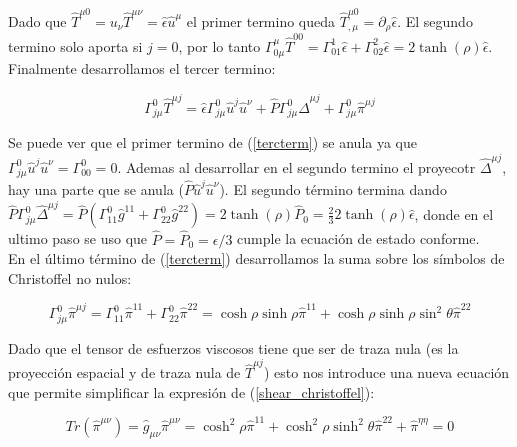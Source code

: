 \documentclass[11pt,a4paper]{article}
\begin{document}
Dado que $\hat{T}^{{\mu}{0}}=u_{\nu}\hat{T}^{{\mu}{\nu}}=\hat{\epsilon}\hat{u}^{\mu}$ el primer termino queda $\hat{T}^{{\mu}{0}}_{,\mu}={\partial}_{\rho}\hat{\epsilon}$. El segundo termino solo aporta si $j=0$, por lo tanto $\Gamma^{\mu}_{{0}{\mu}}\hat{T}^{{0}{0}}=\Gamma^{1}_{{0}{1}}\hat{\epsilon}+\Gamma^{2}_{{0}{2}}\hat{\epsilon}=2\tanh(\rho)\hat{\epsilon}$.
Finalmente desarrollamos el tercer termino:

\begin{equation}
\Gamma^{0}_{{j}{\mu}}\hat{T}^{{\mu}{j}}=\hat{\epsilon}\Gamma^{0}_{{j}{\mu}}\hat{u}^{j}\hat{u}^{\nu}+\hat{P}\Gamma^{0}_{{j}{\mu}}\hat{\Delta}^{{\mu}{j}}+\Gamma^{0}_{{j}{\mu}}\hat{\pi}^{{\mu}{j}}
\label{tercterm}
\end{equation}

Se puede ver que el primer termino de (\ref{tercterm}) se anula ya que $\Gamma^{0}_{{j}{\mu}}\hat{u}^{j}\hat{u}^{\nu}=\Gamma^{0}_{{0}{0}}=0$. Ademas al desarrollar en el segundo termino el proyecotr $\hat{\Delta}^{{\mu}{j}}$, hay una parte que se anula ($\hat{P}\hat{u}^{j}\hat{u}^{\nu}$). El segundo término termina dando $\hat{P}\Gamma^{0}_{{j}{\mu}}\hat{\Delta}^{{\mu}{j}}=\hat{P}(\Gamma^{0}_{{1}{1}}\hat{g}^{{1}{1}}+\Gamma^{0}_{{2}{2}}\hat{g}^{{2}{2}})=2\tanh(\rho)\hat{P}_{0}=\frac{2}{3}2\tanh(\rho)\hat{\epsilon}$, donde en el ultimo paso se uso que $\hat{P}=\hat{P}_{0}=\epsilon/3$ cumple la ecuación de estado conforme.\\





En el último término de (\ref{tercterm}) desarrollamos la suma sobre los símbolos de Christoffel no nulos:

\begin{equation}
\Gamma^{0}_{{j}{\mu}}\hat{\pi}^{{\mu}{j}}=\Gamma^{0}_{{1}{1}}\hat{\pi}^{{1}{1}}+\Gamma^{0}_{{2}{2}}\hat{\pi}^{{2}{2}}=\cosh\rho\sinh\rho\hat{\pi}^{{1}{1}}+\cosh\rho\sinh\rho\sin^2\theta\hat{\pi}^{{2}{2}}
\label{shear_christoffel}
\end{equation}


Dado que el tensor de esfuerzos viscosos tiene que ser de traza nula (es la proyección espacial y de traza nula de $\hat{T}^{{\mu}{j}}$) esto nos introduce una nueva ecuación que permite simplificar la expresión de (\ref{shear_christoffel}):

\begin{equation}
Tr(\hat{\pi}^{{\mu}{\nu}})=\hat{g}_{{\mu}{\nu}}\hat{\pi}^{{\mu}{\nu}}=\cosh^2\rho\hat{\pi}^{{1}{1}}+\cosh^2\rho\sinh^2\theta\hat{\pi}^{{2}{2}}+\hat{\pi}^{{\eta}{\eta}}=0
\label{traza_shear}
\end{equation}
\end{document}
